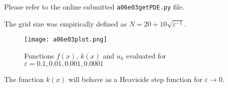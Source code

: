 \newcommand{\assignmentDate}{December 2nd, 2019}




%

%

%

%
%

%

%

%

Please refer to the online submitted \texttt{a06e03getPDE.py} file.


The grid size was empirically defined as $N = 20 + 10\sqrt{\varepsilon^{-1}}$.

\begin{figure}[H]
	\centering
	\texttt{[image: a06e03plot.png]}
	\caption{Functions $f(x)$, $k(x)$ and $u_h$ evaluated for $\varepsilon = 0.1, 0.01, 0.001, 0.0001$}
	\label{fig:a06e03plot}
\end{figure}

The function $k(x)$ will behave as a Heaviside step function for $\varepsilon \to 0$.